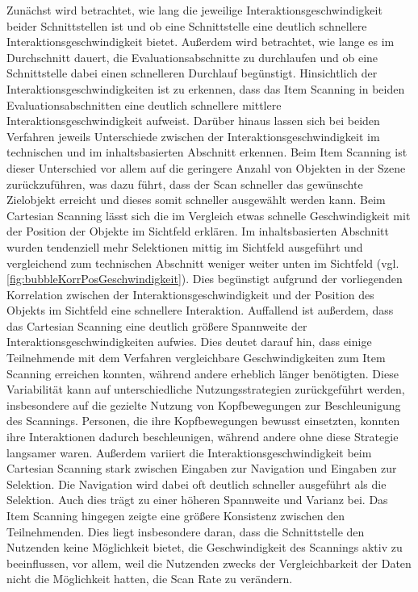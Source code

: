 Zunächst wird betrachtet, wie lang die jeweilige Interaktionsgeschwindigkeit beider Schnittstellen ist und ob eine Schnittstelle eine deutlich schnellere Interaktionsgeschwindigkeit bietet. Außerdem wird betrachtet, wie lange es im Durchschnitt dauert, die Evaluationsabschnitte zu durchlaufen und ob eine Schnittstelle dabei einen schnelleren Durchlauf begünstigt. 
Hinsichtlich der Interaktionsgeschwindigkeiten ist zu erkennen, dass das Item Scanning in beiden Evaluationsabschnitten eine deutlich schnellere mittlere Interaktionsgeschwindigkeit aufweist. 
Darüber hinaus lassen sich bei beiden Verfahren jeweils Unterschiede zwischen der Interaktionsgeschwindigkeit im technischen und im inhaltsbasierten Abschnitt erkennen. Beim Item Scanning ist dieser Unterschied vor allem auf die geringere Anzahl von Objekten in der Szene zurückzuführen, was dazu führt, dass der Scan schneller das gewünschte Zielobjekt erreicht und dieses somit schneller ausgewählt werden kann. Beim Cartesian Scanning lässt sich die im Vergleich etwas schnelle Geschwindigkeit mit der Position der Objekte im Sichtfeld erklären. Im inhaltsbasierten Abschnitt wurden tendenziell mehr Selektionen mittig im Sichtfeld ausgeführt und vergleichend zum technischen Abschnitt weniger weiter unten im Sichtfeld (vgl. \autoref{fig:bubbleKorrPosGeschwindigkeit}). Dies begünstigt aufgrund der vorliegenden Korrelation zwischen der Interaktionsgeschwindigkeit und der Position des Objekts im Sichtfeld eine schnellere Interaktion. 
Auffallend ist außerdem, dass das Cartesian Scanning eine deutlich größere Spannweite der Interaktionsgeschwindigkeiten aufwies. Dies deutet darauf hin, dass einige Teilnehmende mit dem Verfahren vergleichbare Geschwindigkeiten zum Item Scanning erreichen konnten, während andere erheblich länger benötigten. Diese Variabilität kann auf unterschiedliche Nutzungsstrategien zurückgeführt werden, insbesondere auf die gezielte Nutzung von Kopfbewegungen zur Beschleunigung des Scannings. Personen, die ihre Kopfbewegungen bewusst einsetzten, konnten ihre Interaktionen dadurch beschleunigen, während andere ohne diese Strategie langsamer waren. Außerdem variiert die Interaktionsgeschwindigkeit beim Cartesian Scanning stark zwischen Eingaben zur Navigation und Eingaben zur Selektion. Die Navigation wird dabei oft deutlich schneller ausgeführt als die Selektion. Auch dies trägt zu einer höheren Spannweite und Varianz bei. Das Item Scanning hingegen zeigte eine größere Konsistenz zwischen den Teilnehmenden. Dies liegt insbesondere daran, dass die Schnittstelle den Nutzenden keine Möglichkeit bietet, die Geschwindigkeit des Scannings aktiv zu beeinflussen, vor allem, weil die Nutzenden zwecks der Vergleichbarkeit der Daten nicht die Möglichkeit hatten, die Scan Rate zu verändern. 

